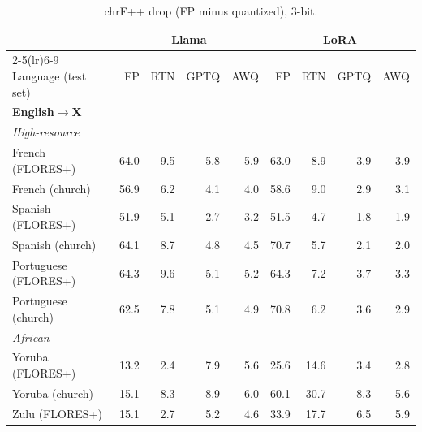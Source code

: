 \begin{table}[htbp]
\centering
\footnotesize
\setlength{\tabcolsep}{3pt}
\caption{chrF++ drop (FP minus quantized), 3-bit.}
\begin{tabular}{lrrrrrrrr}
\toprule
 & \multicolumn{4}{c}{Llama} & \multicolumn{4}{c}{LoRA} \\
\cmidrule(lr){2-5}\cmidrule(lr){6-9}
Language (test set) & FP & RTN & GPTQ & AWQ & FP & RTN & GPTQ & AWQ \\
\midrule
\multicolumn{9}{l}{\textbf{English$\rightarrow$X}} \\ \midrule
\multicolumn{9}{l}{\textit{High-resource}} \\
French (FLORES+) & 64.0 & \cellcolor{loss!17}9.5 & \cellcolor{loss!11}5.8 & \cellcolor{loss!11}5.9 & 63.0 & \cellcolor{loss!16}8.9 & \cellcolor{loss!7}3.9 & \cellcolor{loss!7}3.9 \\
French (church) & 56.9 & \cellcolor{loss!11}6.2 & \cellcolor{loss!8}4.1 & \cellcolor{loss!7}4.0 & 58.6 & \cellcolor{loss!16}9.0 & \cellcolor{loss!5}2.9 & \cellcolor{loss!6}3.1 \\
Spanish (FLORES+) & 51.9 & \cellcolor{loss!9}5.1 & \cellcolor{loss!5}2.7 & \cellcolor{loss!6}3.2 & 51.5 & \cellcolor{loss!9}4.7 & \cellcolor{loss!3}1.8 & \cellcolor{loss!3}1.9 \\
Spanish (church) & 64.1 & \cellcolor{loss!16}8.7 & \cellcolor{loss!9}4.8 & \cellcolor{loss!8}4.5 & 70.7 & \cellcolor{loss!10}5.7 & \cellcolor{loss!4}2.1 & \cellcolor{loss!4}2.0 \\
Portuguese (FLORES+) & 64.3 & \cellcolor{loss!18}9.6 & \cellcolor{loss!9}5.1 & \cellcolor{loss!10}5.2 & 64.3 & \cellcolor{loss!13}7.2 & \cellcolor{loss!7}3.7 & \cellcolor{loss!6}3.3 \\
Portuguese (church) & 62.5 & \cellcolor{loss!14}7.8 & \cellcolor{loss!9}5.1 & \cellcolor{loss!9}4.9 & 70.8 & \cellcolor{loss!11}6.2 & \cellcolor{loss!7}3.6 & \cellcolor{loss!5}2.9 \\
\midrule \multicolumn{9}{l}{\textit{African}} \\
Yoruba (FLORES+) & 13.2 & \cellcolor{loss!4}2.4 & \cellcolor{loss!14}7.9 & \cellcolor{loss!10}5.6 & 25.6 & \cellcolor{loss!27}14.6 & \cellcolor{loss!6}3.4 & \cellcolor{loss!5}2.8 \\
Yoruba (church) & 15.1 & \cellcolor{loss!15}8.3 & \cellcolor{loss!16}8.9 & \cellcolor{loss!11}6.0 & 60.1 & \cellcolor{loss!56}30.7 & \cellcolor{loss!15}8.3 & \cellcolor{loss!10}5.6 \\
Zulu (FLORES+) & 15.1 & \cellcolor{loss!5}2.7 & \cellcolor{loss!10}5.2 & \cellcolor{loss!8}4.6 & 33.9 & \cellcolor{loss!32}17.7 & \cellcolor{loss!12}6.5 & \cellcolor{loss!11}5.9 \\

\end{tabular}
\end{table}

